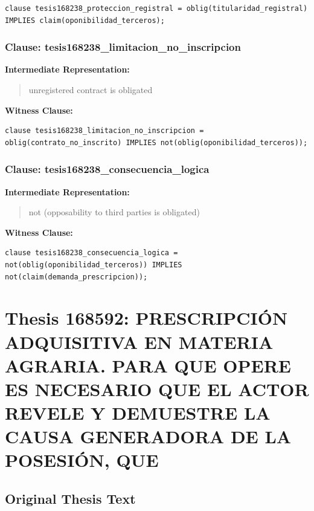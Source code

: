 \documentclass[11pt,a4paper]{article}
\begin{document}
\begin{lstlisting}[style=witnessstyle, language=Witness]
clause tesis168238_proteccion_registral = oblig(titularidad_registral) IMPLIES claim(oponibilidad_terceros);
\end{lstlisting}

\subsubsection{Clause: tesis168238\_limitacion\_no\_inscripcion}

\textbf{Intermediate Representation:}

\begin{quote}
unregistered contract is obligated
\end{quote}

\textbf{Witness Clause:}

\begin{lstlisting}[style=witnessstyle, language=Witness]
clause tesis168238_limitacion_no_inscripcion = oblig(contrato_no_inscrito) IMPLIES not(oblig(oponibilidad_terceros));
\end{lstlisting}

\subsubsection{Clause: tesis168238\_consecuencia\_logica}

\textbf{Intermediate Representation:}

\begin{quote}
not (opposability to third parties is obligated)
\end{quote}

\textbf{Witness Clause:}

\begin{lstlisting}[style=witnessstyle, language=Witness]
clause tesis168238_consecuencia_logica = not(oblig(oponibilidad_terceros)) IMPLIES not(claim(demanda_prescripcion));
\end{lstlisting}

\newpage

\section{Thesis 168592: PRESCRIPCIÓN ADQUISITIVA EN MATERIA AGRARIA. PARA QUE OPERE ES NECESARIO QUE EL ACTOR REVELE Y DEMUESTRE LA CAUSA GENERADORA DE LA POSESIÓN, QUE}
\label{thesis:168592}

\subsection{Original Thesis Text}
\end{document}
